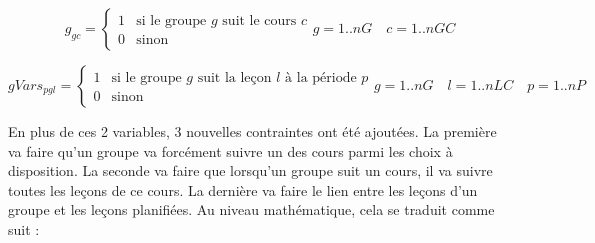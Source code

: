 \begin{equation*}
    g_{gc} =
    \begin{cases}
    1 & \text{si le groupe $g$ suit le cours $c$} \\
    0 & \text{sinon}
    \end{cases}
    g = 1 .. nG \quad c = 1 .. nGC
\end{equation*}

\begin{equation*}
    gVars_{pgl} =
    \begin{cases}
    1 & \text{si le groupe $g$ suit la leçon $l$ à la période $p$} \\
    0 & \text{sinon}
    \end{cases}
    g = 1 .. nG \quad l = 1 .. nLC \quad p = 1 .. nP
\end{equation*}

En plus de ces 2 variables, 3 nouvelles contraintes ont été ajoutées. La première va faire qu'un groupe va forcément suivre un des cours parmi les choix à disposition. La seconde va faire que lorsqu'un groupe suit un cours, il va suivre toutes les leçons de ce cours. La dernière va faire le lien entre les leçons d'un groupe et les leçons planifiées. Au niveau mathématique, cela se traduit comme suit :


